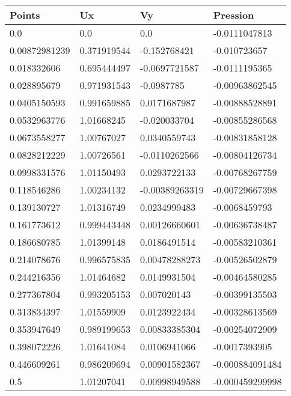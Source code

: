 \begin{tabular}{llll}
	Points & Ux & Vy & Pression \\ 
\midrule 
	0.0 & 0.0 & 0.0 & -0.0111047813 \\ 
	0.00872981239 & 0.371919544 & -0.152768421 & -0.010723657 \\ 
	0.018332606 & 0.695444497 & -0.0697721587 & -0.0111195365 \\ 
	0.028895679 & 0.971931543 & -0.0987785 & -0.00963862545 \\ 
	0.0405150593 & 0.991659885 & 0.0171687987 & -0.00888528891 \\ 
	0.0532963776 & 1.01668245 & -0.020033704 & -0.00855286568 \\ 
	0.0673558277 & 1.00767027 & 0.0340559743 & -0.00831858128 \\ 
	0.0828212229 & 1.00726561 & -0.0110262566 & -0.00804126734 \\ 
	0.0998331576 & 1.01150493 & 0.0293722133 & -0.00768267759 \\ 
	0.118546286 & 1.00234132 & -0.00389263319 & -0.00729667398 \\ 
	0.139130727 & 1.01316749 & 0.0234999483 & -0.0068459793 \\ 
	0.161773612 & 0.999443448 & 0.00126660601 & -0.00636738487 \\ 
	0.186680785 & 1.01399148 & 0.0186491514 & -0.00583210361 \\ 
	0.214078676 & 0.996575835 & 0.00478288273 & -0.00526502879 \\ 
	0.244216356 & 1.01464682 & 0.0149931504 & -0.00464580285 \\ 
	0.277367804 & 0.993205153 & 0.007020143 & -0.00399135503 \\ 
	0.313834397 & 1.01559909 & 0.0123922434 & -0.00328613569 \\ 
	0.353947649 & 0.989199653 & 0.00833385304 & -0.00254072909 \\ 
	0.398072226 & 1.01641084 & 0.0106941066 & -0.0017393905 \\ 
	0.446609261 & 0.986209694 & 0.00901582367 & -0.000884091484 \\ 
	0.5 & 1.01207041 & 0.00998949588 & -0.000459299998 \\ 
\end{tabular}